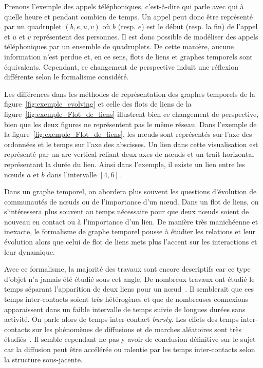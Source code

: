 Prenons l'exemple des appels téléphoniques, c'est-à-dire qui parle avec qui à quelle heure et pendant combien de temps.
Un appel peut donc être représenté par un quadruplet $(b,e,u,v)$ où $b$ (resp. $e$) est le début (resp. la fin) de l'appel et $u$ et $v$ représentent des personnes.
Il est donc possible de modéliser des appels téléphoniques par un ensemble de quadruplets.
De cette manière, aucune information n'est perdue et, en ce sens, flots de liens et graphes temporels sont équivalents. 
Cependant, ce changement de perspective induit une réflexion différente selon le formalisme considéré.

Les différences dans les méthodes de représentation des graphes temporels de la figure~\ref{fig:exemple_evolving} et celle des flots de liens de la figure~\ref{fig:exemple_Flot_de_liens} illustrent bien ce changement de perspective, bien que les deux figures ne représentent pas le même réseau.
Dans l'exemple de la figure~\ref{fig:exemple_Flot_de_liens}, les n\oe{}uds sont représentés sur l'axe des ordonnées et le temps sur l'axe des abscisses.
Un lien dans cette visualisation est représenté par un arc vertical reliant deux axes de n\oe{}uds et un trait horizontal représentant la durée du lien.
Ainsi dans l'exemple, il existe un lien entre les n\oe{}uds $a$ et $b$ dans l'intervalle $[4,6]$.

Dans un graphe temporel, on abordera plus souvent les questions d'évolution de communautés de n\oe{}uds ou de l'importance d'un n\oe{}ud.
Dans un flot de liens, on s'intéressera plus souvent au temps nécessaire pour que deux n\oe{}uds soient de nouveau en contact ou à l'importance d'un lien.
De manière très manichéenne et inexacte, le formalisme de graphe temporel pousse à étudier les relations et leur évolution alors que celui de flot de liens mets plus l'accent sur les interactions et leur dynamique.

\bigskip



Avec ce formalisme, la majorité des travaux sont encore descriptifs car ce type d'objet n'a jamais été étudié sous cet angle.
De nombreux travaux ont étudié le temps séparant l'apparition de deux liens pour un n\oe{}ud~\cite{Malmgren2008,Malmgren2009}.
Il semblerait que ces temps inter-contacts soient très hétérogènes et que de nombreuses connexions apparaissent dans un faible intervalle de temps suivie de longues durées sans activité.
On parle alors de temps inter-contact \emph{bursty}.
Les effets des temps inter-contacts sur les phénomènes de diffusions et de marches aléatoires sont très étudiés~\cite{Karsai2011,Karsai2012a,Starnini2012b,Rocha2013}.
Il semble cependant ne pas y avoir de conclusion définitive sur le sujet car la diffusion peut être accélérée ou ralentie par les temps inter-contacts selon la structure sous-jacente.

